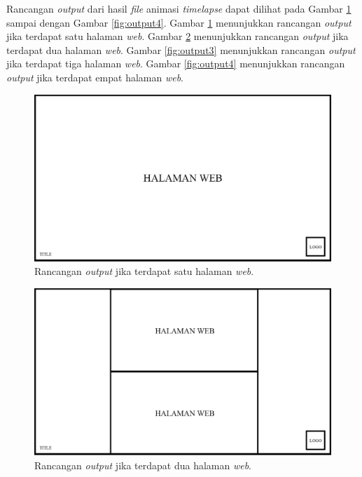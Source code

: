 Rancangan \textit{output} dari hasil \textit{file} animasi \textit{timelapse} dapat dilihat pada Gambar \ref{fig:output1} sampai dengan Gambar \ref{fig:output4}. Gambar \ref{fig:output1} menunjukkan rancangan \textit{output} jika terdapat satu halaman \textit{web}. Gambar \ref{fig:output2} menunjukkan rancangan \textit{output} jika terdapat dua halaman \textit{web}. Gambar \ref{fig:output3} menunjukkan rancangan \textit{output} jika terdapat tiga halaman \textit{web}. Gambar \ref{fig:output4} menunjukkan rancangan \textit{output} jika terdapat empat halaman \textit{web}. 

\begin{figure}[H]
	\centering
		\includegraphics[scale=0.3]{Gambar/output_1.png}
	\caption{Rancangan \textit{output} jika terdapat satu halaman \textit{web}.}
	\label{fig:output1}
\end{figure}

\begin{figure}[H]
	\centering
		\includegraphics[scale=0.3]{Gambar/output_2.png}
	\caption{Rancangan \textit{output} jika terdapat dua halaman \textit{web}.}
	\label{fig:output2}
\end{figure}

